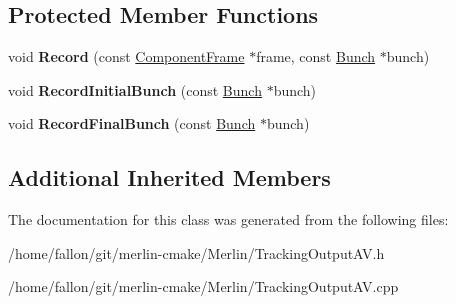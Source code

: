 \subsection*{Protected Member Functions}
\begin{DoxyCompactItemize}
\item 
\mbox{\label{classTrackingOutputAV_aaf267e79922e403d200a9bb4b96319fb}} 
void {\bfseries Record} (const \hyperlink{classComponentFrame}{Component\+Frame} $\ast$frame, const \hyperlink{classBunch}{Bunch} $\ast$bunch)
\item 
\mbox{\label{classTrackingOutputAV_aa35cb50bba483f10c4e41281669db1cb}} 
void {\bfseries Record\+Initial\+Bunch} (const \hyperlink{classBunch}{Bunch} $\ast$bunch)
\item 
\mbox{\label{classTrackingOutputAV_a9370cdf7ecd21cf92a3c45e34f8bc75b}} 
void {\bfseries Record\+Final\+Bunch} (const \hyperlink{classBunch}{Bunch} $\ast$bunch)
\end{DoxyCompactItemize}
\subsection*{Additional Inherited Members}


The documentation for this class was generated from the following files\+:\begin{DoxyCompactItemize}
\item 
/home/fallon/git/merlin-\/cmake/\+Merlin/Tracking\+Output\+A\+V.\+h\item 
/home/fallon/git/merlin-\/cmake/\+Merlin/Tracking\+Output\+A\+V.\+cpp\end{DoxyCompactItemize}
